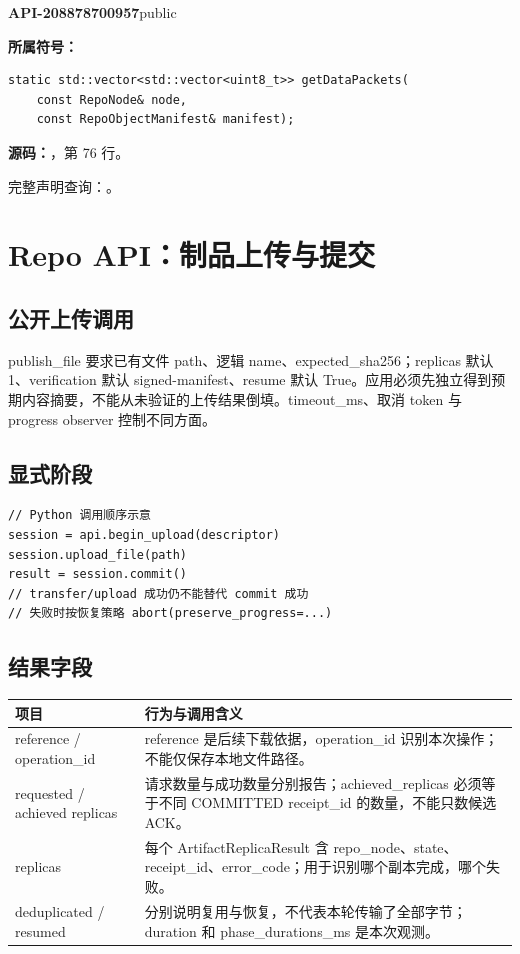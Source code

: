 \textbf{API-208878700957}\quad public\par
\textbf{所属符号：}\par
\begin{Verbatim}[fontsize=\footnotesize,breaklines,breakanywhere]
static std::vector<std::vector<uint8_t>> getDataPackets(
    const RepoNode& node,
    const RepoObjectManifest& manifest);
\end{Verbatim}
\textbf{源码：}，第 76 行。\par

完整声明查询：。

\section{Repo API：制品上传与提交}

\subsection{公开上传调用}
publish\_file 要求已有文件 path、逻辑 name、expected\_sha256；replicas 默认 1、verification 默认 signed-manifest、resume 默认 True。应用必须先独立得到预期内容摘要，不能从未验证的上传结果倒填。timeout\_ms、取消 token 与 progress observer 控制不同方面。

\subsection{显式阶段}

\begin{Verbatim}[fontsize=\footnotesize,breaklines,breakanywhere]
// Python 调用顺序示意
session = api.begin_upload(descriptor)
session.upload_file(path)
result = session.commit()
// transfer/upload 成功仍不能替代 commit 成功
// 失败时按恢复策略 abort(preserve_progress=...)
\end{Verbatim}

\subsection{结果字段}

\begin{longtable}{@{}p{43mm}p{119mm}@{}}
\toprule
项目 & 行为与调用含义 \\
\midrule\endhead
reference / operation\_id & reference 是后续下载依据，operation\_id 识别本次操作；不能仅保存本地文件路径。 \\
requested / achieved replicas & 请求数量与成功数量分别报告；achieved\_replicas 必须等于不同 COMMITTED receipt\_id 的数量，不能只数候选 ACK。 \\
replicas & 每个 ArtifactReplicaResult 含 repo\_node、state、receipt\_id、error\_code；用于识别哪个副本完成，哪个失败。 \\
deduplicated / resumed & 分别说明复用与恢复，不代表本轮传输了全部字节；duration 和 phase\_durations\_ms 是本次观测。 \\
\bottomrule
\end{longtable}

